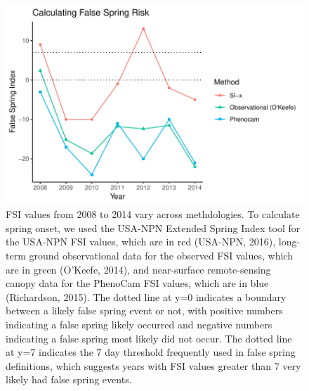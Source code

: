 \documentclass{article}\usepackage[]{graphicx}\usepackage[]{color}
\makeatletter
\def\maxwidth{ %
  \ifdim\Gin@nat@width>\linewidth
    \linewidth
  \else
    \Gin@nat@width
  \fi
}
\makeatother
\begin{document}
\begin{figure}[H]

{\centering \includegraphics[width=\maxwidth]{figure/fsifig-1} 

}

\caption[FSI values from 2008 to 2014 vary across methdologies]{FSI values from 2008 to 2014 vary across methdologies. To calculate spring onset, we used the USA-NPN Extended Spring Index tool for the USA-NPN FSI values, which are in red (USA-NPN, 2016), long-term ground observational data for the observed FSI values, which are in green (O'Keefe, 2014), and near-surface remote-sensing canopy data for the PhenoCam FSI values, which are in blue (Richardson, 2015). The dotted line at y=0 indicates a boundary between a likely false spring event or not, with positive numbers indicating a false spring likely occurred and negative numbers indicating a false spring most likely did not occur. The dotted line at y=7 indicates the 7 day threshold frequently used in false spring definitions, which suggests years with FSI values greater than 7 very likely had false spring events.}\label{fig:fsifig}
\end{figure}
\end{document}
